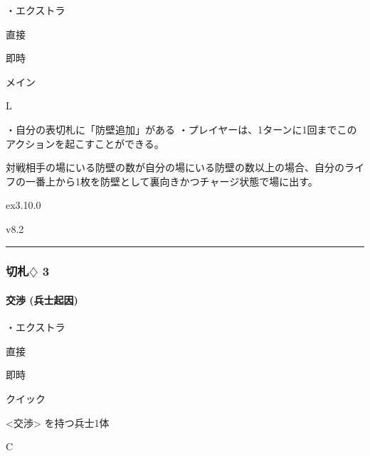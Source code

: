 \documentclass[letterpaper,10pt,dvipdfmx]{sphinxmanual}
\begin{document}
\sphinxAtStartPar
・エクストラ

\sphinxAtStartPar
{} 直接

\sphinxAtStartPar
{} 即時

\sphinxAtStartPar
{} メイン

\sphinxAtStartPar
{} L

\sphinxAtStartPar
{}

\sphinxAtStartPar
・自分の表切札に「防壁追加」がある
・プレイヤーは、1ターンに1回までこのアクションを起こすことができる。

\sphinxAtStartPar
{}

\sphinxAtStartPar
対戦相手の場にいる防壁の数が自分の場にいる防壁の数以上の場合、自分のライフの一番上から1枚を防壁として裏向きかつチャージ状態で場に出す。

\sphinxAtStartPar
{}  ex3.10.0

\sphinxAtStartPar
{}  v8.2


\bigskip\hrule\bigskip



\subsubsection{切札{\normalsize $\diamondsuit$} 3}
\label{\detokenize{auto/frameActionlist:id53}}

\paragraph{交渉 (兵士起因)}
\label{\detokenize{auto/frameActionlist:act-negotiate}}\label{\detokenize{auto/frameActionlist:id54}}
\sphinxAtStartPar
{}

\sphinxAtStartPar
・エクストラ

\sphinxAtStartPar
{} 直接

\sphinxAtStartPar
{} 即時

\sphinxAtStartPar
{} クイック

\sphinxAtStartPar
{} \textless{}交渉\textgreater{} を持つ兵士1体

\sphinxAtStartPar
{} C

\sphinxAtStartPar
{}
\end{document}
